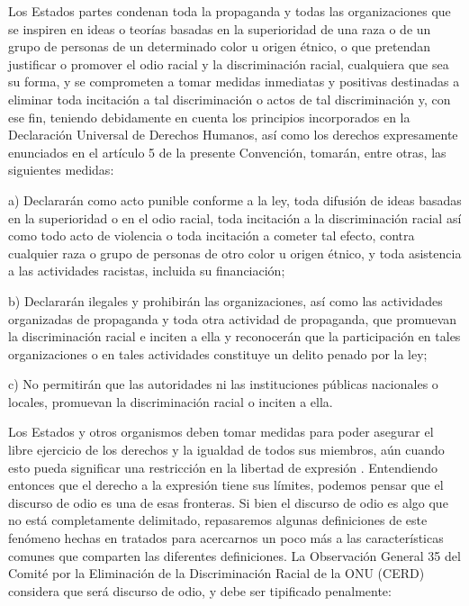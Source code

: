 \begin{displayquote}

Los Estados partes condenan toda la propaganda y todas las organizaciones que se inspiren en ideas o teorías basadas en la superioridad de una raza o de un grupo de personas de un determinado color u origen étnico, o que pretendan justificar o promover el odio racial y la discriminación racial, cualquiera que sea su forma, y se comprometen a tomar medidas inmediatas y positivas destinadas a eliminar toda incitación a tal discriminación o actos de tal discriminación y, con ese fin, teniendo debidamente en cuenta los principios incorporados en la Declaración Universal de Derechos Humanos, así como los derechos expresamente enunciados en el artículo 5 de la presente Convención, tomarán, entre otras, las siguientes medidas:

a) Declararán como acto punible conforme a la ley, toda difusión de ideas basadas en la superioridad o en el odio racial, toda incitación a la discriminación racial así como todo acto de violencia o toda incitación a cometer tal efecto, contra cualquier raza o grupo de personas de otro color u origen étnico, y toda asistencia a las actividades racistas, incluida su financiación;

b) Declararán ilegales y prohibirán las organizaciones, así como las actividades organizadas de propaganda y toda otra actividad de propaganda, que promuevan la discriminación racial e inciten a ella y reconocerán que la participación en tales organizaciones o en tales actividades constituye un delito penado por la ley;

c) No permitirán que las autoridades ni las instituciones públicas nacionales o locales, promuevan la discriminación racial o inciten a ella.
\end{displayquote}


Los Estados y otros organismos deben tomar medidas para poder asegurar el libre ejercicio de los derechos y la igualdad de todos sus miembros, aún cuando esto pueda significar una restricción en la libertad de expresión \cite{article192015}. Entendiendo entonces que el derecho a la expresión tiene sus límites, podemos pensar que el discurso de odio es una de esas fronteras. Si bien el discurso de odio es algo que no está completamente delimitado, repasaremos algunas definiciones de este fenómeno hechas en tratados para acercarnos un poco más a las características comunes que comparten las diferentes definiciones. La Observación General 35 del Comité por la Eliminación de la Discriminación Racial de la ONU (CERD) considera que será discurso de odio, y debe ser tipificado penalmente:

